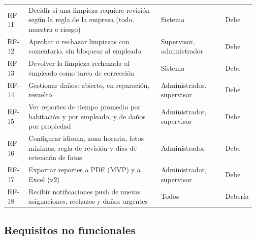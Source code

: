 \documentclass[11pt,a4paper]{article}
\begin{document}
{\begin{longtable}{L{1.2cm} L{8.6cm} L{3.1cm} L{1.7cm}}
RF-11 & Decidir si una limpieza requiere revisión según la regla de la empresa (todo, muestra o riesgo) & Sistema & Debe\\
RF-12 & Aprobar o rechazar limpiezas con comentario, sin bloquear al empleado & Supervisor, administrador & Debe\\
RF-13 & Devolver la limpieza rechazada al empleado como tarea de corrección & Sistema & Debe\\
RF-14 & Gestionar daños: abierto, en reparación, resuelto & Administrador, supervisor & Debe\\
RF-15 & Ver reportes de tiempo promedio por habitación y por empleado, y de daños por propiedad & Administrador, supervisor & Debe\\
RF-16 & Configurar idioma, zona horaria, fotos mínimas, regla de revisión y días de retención de fotos & Administrador & Debe\\
RF-17 & Exportar reportes a PDF (MVP) y a Excel (v2) & Administrador, supervisor & Debe\\
RF-18 & Recibir notificaciones push de nuevas asignaciones, rechazos y daños urgentes & Todos & Debería\\
\end{longtable}
}

\subsection{Requisitos no funcionales}
\end{document}
